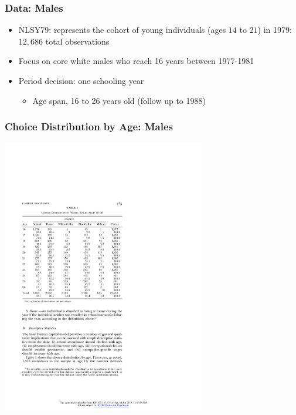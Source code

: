 \begin{frame}
	\frametitle{Data: Males}
		\begin{itemize}
			\item NLSY79: represents the cohort of young individuals (ages $14$ to $21$) in 1979: $12,686$ total observations
			\item Focus on core white males who reach 16 years between 1977-1981
			\item Period decision: one schooling year
			\begin{itemize}
				\item Age span, 16 to 26 years old (follow up to 1988)
			\end{itemize}						
		\end{itemize}
\end{frame}

\begin{frame}
	\frametitle{Choice Distribution by Age: Males}
	\begin{center}
	\includegraphics[width=3.5in]{tab-figs/table1_1997}
	\end{center}
\end{frame}

